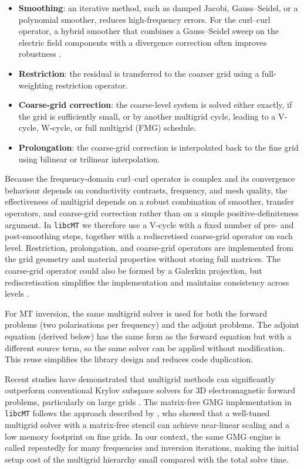 \documentclass{article}
\begin{document}
\begin{itemize}
  \item \textbf{Smoothing}: an iterative method, such as damped Jacobi, Gauss--Seidel, or a polynomial smoother, reduces high-frequency errors. For the curl--curl operator, a hybrid smoother that combines a Gauss--Seidel sweep on the electric field components with a divergence correction often improves robustness \citep{Mulder2006, Yang_2024_multigrid}.
  \item \textbf{Restriction}: the residual is transferred to the coarser grid using a full-weighting restriction operator.
  \item \textbf{Coarse-grid correction}: the coarse-level system is solved either exactly, if the grid is sufficiently small, or by another multigrid cycle, leading to a V-cycle, W-cycle, or full multigrid (FMG) schedule.
  \item \textbf{Prolongation}: the coarse-grid correction is interpolated back to the fine grid using bilinear or trilinear interpolation.
\end{itemize}

Because the frequency-domain curl--curl operator is complex and its convergence behaviour depends on conductivity contrasts, frequency, and mesh quality, the effectiveness of multigrid depends on a robust combination of smoother, transfer operators, and coarse-grid correction rather than on a simple positive-definiteness argument. In \texttt{libcMT} we therefore use a V-cycle with a fixed number of pre- and post-smoothing steps, together with a rediscretised coarse-grid operator on each level. Restriction, prolongation, and coarse-grid operators are implemented from the grid geometry and material properties without storing full matrices. The coarse-grid operator could also be formed by a Galerkin projection, but rediscretisation simplifies the implementation and maintains consistency across levels \citep{Mulder2006}.

For MT inversion, the same multigrid solver is used for both the forward problems (two polarisations per frequency) and the adjoint problems. The adjoint equation (derived below) has the same form as the forward equation but with a different source term, so the same solver can be applied without modification. This reuse simplifies the library design and reduces code duplication.

Recent studies have demonstrated that multigrid methods can significantly outperform conventional Krylov subspace solvers for 3D electromagnetic forward problems, particularly on large grids \citep{Mulder2006, WangEtAl2022, HuangEtAl2023}. The matrix-free GMG implementation in \texttt{libcMT} follows the approach described by \citet{Yang_2024_multigrid}, who showed that a well-tuned multigrid solver with a matrix-free stencil can achieve near-linear scaling and a low memory footprint on fine grids. In our context, the same GMG engine is called repeatedly for many frequencies and inversion iterations, making the initial setup cost of the multigrid hierarchy small compared with the total solve time.
\end{document}
